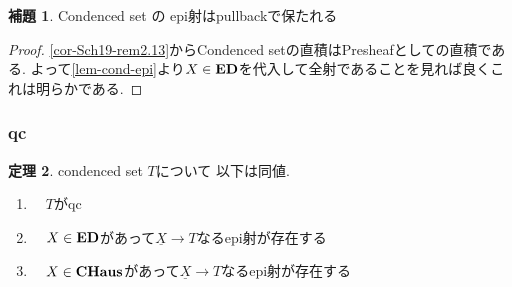 \documentclass[dvipdfmx,a4paper,11pt]{report}
\theoremstyle{definition}
\newtheorem{thm}{定理}
\newtheorem{lem}[thm]{補題}
\begin{document}
 

 \begin{tcolorbox}
 [colback = white, colframe = green!35!black, fonttitle = \bfseries,breakable = true]
  \begin{lem}\cite[Lemma 3.6.2]{Bar22}
\label{lem-ep-pullback}
Condenced set の epi射はpullbackで保たれる
  \end{lem}
  \end{tcolorbox}
 \begin{proof}
 \ref{cor-Sch19-rem2.13}からCondenced setの直積はPresheafとしての直積である.
 よって\ref{lem-cond-epi}より$X \in {\bf ED}$を代入して全射であることを見れば良くこれは明らかである.
 \end{proof}

 \subsubsection{qc}
   \begin{tcolorbox}
 [colback = white, colframe = green!35!black, fonttitle = \bfseries,breakable = true]
 \begin{thm}\cite[Proposition 4.11.11]{Bar22}
 \label{thm-qc-represent}
condenced set $T$について 以下は同値.
 \begin{enumerate}
 \item　$T$がqc
 \item　$X \in {\bf ED}$があって$\underline{X}\to T$なるepi射が存在する
 \item　$X \in {\bf CHaus}$があって$\underline{X}\to T$なるepi射が存在する
 \end{enumerate}
 \end{thm}
 \end{tcolorbox}
 
\end{document}
